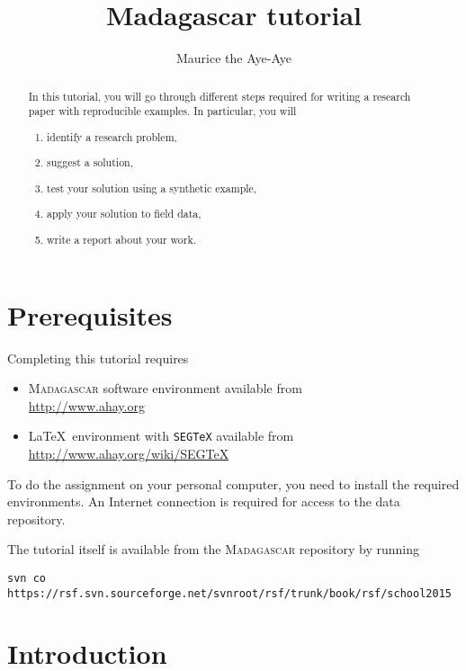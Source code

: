 \author{Maurice the Aye-Aye}
\title{Madagascar tutorial}


\maketitle

\begin{abstract}
  In this tutorial, you will go through different steps required for writing a research paper with reproducible examples. In particular, you will
  \begin{enumerate}
    \item identify a research problem,
    \item suggest a solution,
    \item test your solution using a synthetic example,
    \item apply your solution to field data,
    \item write  a report about your work.
  \end{enumerate}
\end{abstract}

\section{Prerequisites}

Completing this tutorial requires
\begin{itemize}
\item \textsc{Madagascar} software environment available from \\
\url{http://www.ahay.org}
\item \LaTeX\ environment with \texttt{SEGTeX} available from \\ 
\url{http://www.ahay.org/wiki/SEGTeX}
\end{itemize}
To do the assignment on your personal computer, you need to install
the required environments. An Internet connection is required for
access to the data repository.

The tutorial itself is available from the \textsc{Madagascar} repository
by running
\begin{verbatim}
svn co https://rsf.svn.sourceforge.net/svnroot/rsf/trunk/book/rsf/school2015
\end{verbatim}

\section{Introduction}

